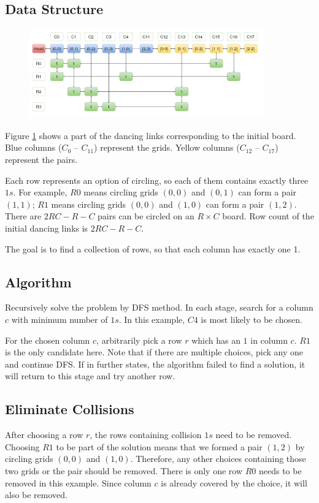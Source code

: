 \documentclass[12pt]{article}
\begin{document}
\subsection*{Data Structure}
	\begin{figure}[H]
	\centering
	\includegraphics[width=0.9\textwidth]{fig_imp_ds}
	\caption[Caption for the list of figures]{}
	\label{fig:imp_ds}
	\end{figure}
Figure \ref{fig:imp_ds} shows a part of the dancing links corresponding to the initial board. Blue columns ($C_0$ -- $C_{11}$) represent the grids. Yellow columns ($C_{12}$ -- $C_{17}$) represent the pairs.

Each row represents an option of circling, so each of them contains exactly three $1s$. For example, $R0$ means circling grids $(0,0)$ and $(0,1)$ can form a pair $(1,1)$; $R1$ means circling grids $(0,0)$ and $(1,0)$ can form a pair $(1,2)$.
There are $2RC-R-C$ pairs can be circled on an $R\times C$ board. Row count of the initial dancing links is $2RC-R-C$.

The goal is to find a collection of rows, so that each column has exactly one 1.

\subsection*{Algorithm}
Recursively solve the problem by DFS method. In each stage, search for a column $c$ with minimum number of $1s$. In this example, $C4$ is most likely to be chosen.

For the chosen column $c$, arbitrarily pick a row $r$ which has an $1$ in column $c$. $R1$ is the only candidate here. Note that if there are multiple choices, pick any one and continue DFS. If in further states, the algorithm failed to find a solution, it will return to this stage and try another row.

\subsection*{Eliminate Collisions}
After choosing a row $r$, the rows containing collision $1s$ need to be removed. Choosing $R1$ to be part of the solution means that we formed a pair $(1,2)$ by circling grids $(0,0)$ and $(1,0)$. Therefore, any other choices containing those two grids or the pair should be removed. There is only one row $R0$ needs to be removed in this example. Since column $c$ is already covered by the choice, it will also be removed.
\end{document}
